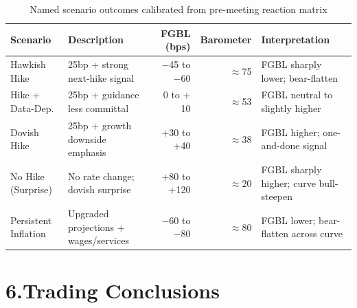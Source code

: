 \documentclass[11pt,a4paper]{article}
\begin{document}
\vspace{0.2cm}
\begin{table}[H]
\centering
\caption{Named scenario outcomes calibrated from pre-meeting reaction matrix}
\small
\setlength{\tabcolsep}{5pt}
\begin{tabularx}{\textwidth}{lXrr>{\raggedright\arraybackslash}X}
\toprule
\rowcolor{lightgrey}
\textbf{Scenario} & \textbf{Description} & \textbf{FGBL (bps)} & \textbf{Barometer} & \textbf{Interpretation} \\
\midrule
Hawkish Hike
    & 25bp + strong next-hike signal
    & $-$45 to $-$60
    & $\approx$75
    & \textcolor{hawkred}{FGBL sharply lower; bear-flatten} \\
\addlinespace[3pt]
Hike + Data-Dep.
    & 25bp + guidance less committal
    & 0 to $+$10
    & $\approx$53
    & \textcolor{neutgrey}{FGBL neutral to slightly higher} \\
\addlinespace[3pt]
Dovish Hike
    & 25bp + growth downside emphasis
    & $+$30 to $+$40
    & $\approx$38
    & \textcolor{dovblue}{FGBL higher; one-and-done signal} \\
\addlinespace[3pt]
No Hike (Surprise)
    & No rate change; dovish surprise
    & $+$80 to $+$120
    & $\approx$20
    & \textcolor{dovblue}{FGBL sharply higher; curve bull-steepen} \\
\addlinespace[3pt]
Persistent Inflation
    & Upgraded projections + wages/services
    & $-$60 to $-$80
    & $\approx$80
    & \textcolor{hawkred}{FGBL lower; bear-flatten across curve} \\
\bottomrule
\end{tabularx}
\end{table}

\section*{6.\quad Trading Conclusions}
\end{document}
